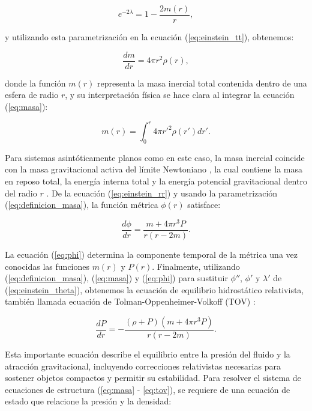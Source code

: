 \begin{equation}
	e^{-2\lambda} = 1 - \frac{2m(r)}{r},
	\label{eq:definicion_masa}
\end{equation}

y utilizando esta parametrización en la ecuación (\ref{eq:einstein_tt}), obtenemos:

\begin{equation}
	\frac{dm}{dr} = 4\pi r^2 \rho(r),
	\label{eq:masa}
\end{equation}

donde la función $m(r)$ representa la masa inercial total contenida dentro de una esfera de radio $r$, y su interpretación física se hace clara al integrar la ecuación (\ref{eq:masa}):

\begin{equation*}
	m(r) = \int_0^r 4\pi r'^2 \rho(r') dr'.
\end{equation*}

Para sistemas asintóticamente planos como en este caso, la masa inercial coincide con la masa gravitacional activa del límite Newtoniano \cite{vollickMeaningVariousMass2021}, la cual contiene la masa en reposo total, la energía interna total y la energía potencial gravitacional dentro del radio $r$ \cite{misnerGravitation2017}. De la ecuación (\ref{eq:einstein_rr}) y usando la parametrización (\ref{eq:definicion_masa}), la función métrica $\phi(r)$ satisface:

\begin{equation}
	\frac{d\phi}{dr} = \frac{m + 4\pi r^3 P}{r(r - 2m)}.
	\label{eq:phi}
\end{equation}

La ecuación (\ref{eq:phi}) determina la componente temporal de la métrica una vez conocidas las funciones $m(r)$ y $P(r)$. Finalmente, utilizando (\ref{eq:definicion_masa}), (\ref{eq:masa}) y (\ref{eq:phi}) para sustituir $\phi''$, $\phi'$ y $\lambda'$ de (\ref{eq:einstein_theta}), obtenemos la ecuación de equilibrio hidrostático relativista, también llamada ecuación de Tolman-Oppenheimer-Volkoff (TOV) \cite{oppenheimerMassiveNeutronCores1939}:

\begin{equation}
	\frac{dP}{dr} = -\frac{(\rho + P)(m + 4\pi r^3 P)}{r(r - 2m)}.
	\label{eq:tov}
\end{equation}

Esta importante ecuación describe el equilibrio entre la presión del fluido y la atracción gravitacional, incluyendo correcciones relativistas necesarias para sostener objetos compactos \cite{oppenheimerMassiveNeutronCores1939} y permitir su estabilidad. Para resolver el sistema de ecuaciones de estructura (\ref{eq:masa} - \ref{eq:tov}), se requiere de una ecuación de estado que relacione la presión y la densidad:

